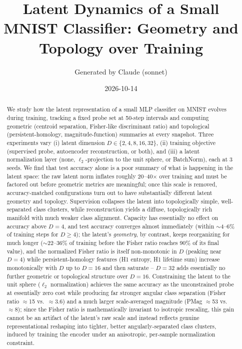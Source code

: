\documentclass[11pt]{article}
\title{Latent Dynamics of a Small MNIST Classifier: Geometry and Topology over Training}
\author{Generated by Claude (sonnet)}
\date{2026-10-14}
\begin{document}
\maketitle

\begin{abstract}
We study how the latent representation of a small MLP classifier on MNIST evolves
during training, tracking a fixed probe set at 50-step intervals and computing
geometric (centroid separation, Fisher-like discriminant ratio) and topological
(persistent-homology, magnitude-function) summaries at every snapshot. Three
experiments vary (i) latent dimension $D \in \{2,4,8,16,32\}$, (ii) training
objective (supervised probe, autoencoder reconstruction, or both), and (iii)
a latent normalization layer (none, $\ell_2$-projection to the unit sphere, or
BatchNorm), each at 3 seeds. We find that test accuracy alone is a poor summary
of what is happening in the latent space: the raw latent norm inflates roughly
20--40$\times$ over training and must be factored out before geometric metrics
are meaningful; once this scale is removed, accuracy-matched configurations
turn out to have substantially different latent geometry and topology.
Supervision collapses the latent into topologically simple, well-separated
class clusters, while reconstruction yields a diffuse, topologically rich
manifold with much weaker class alignment. Capacity has essentially no effect
on accuracy above $D{=}4$, and test accuracy converges almost immediately
(within $\sim$4--6\% of training steps for $D\ge4$); the latent's
\emph{geometry}, by contrast, keeps reorganizing for much longer
($\sim$22--36\% of training before the Fisher ratio reaches 90\% of its
final value), and the normalized Fisher ratio is itself non-monotonic in $D$
(peaking near $D{=}4$) while persistent-homology features (H1 entropy, H1
lifetime sum) increase monotonically with $D$ up to $D{=}16$ and then
saturate -- $D{=}32$ adds essentially no further geometric or topological
structure over $D{=}16$. Constraining the latent to the unit sphere
($\ell_2$ normalization) achieves the same accuracy as the unconstrained
probe at essentially zero cost while producing far stronger angular class
separation (Fisher ratio $\approx$15 vs.\ $\approx$3.6) and a much larger
scale-averaged magnitude (PMag $\approx$53 vs.\ $\approx$8); since the
Fisher ratio is mathematically invariant to isotropic rescaling, this gain
cannot be an artifact of the latent's raw scale and instead reflects genuine
representational reshaping into tighter, better angularly-separated class
clusters, induced by training the encoder under an anisotropic, per-sample
normalization constraint.
\end{abstract}
\end{document}

